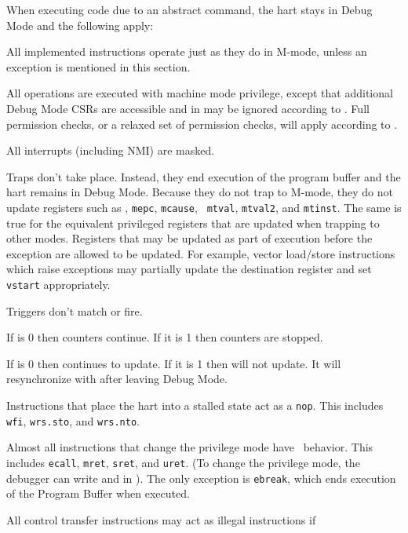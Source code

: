 \begin{steps}{When executing code due to an abstract command, the hart stays in
    Debug Mode and the following apply:}
\item All implemented instructions operate just as they do in M-mode, unless
    an exception is mentioned in this section.
\item All operations are executed with machine mode privilege, except that
    additional Debug Mode CSRs are accessible and
    \FcsrMstatusMprv in \Rmstatus may be ignored according to \FcsrDcsrMprven.
    Full permission checks, or a relaxed set of permission checks, will apply
    according to \FdmAbstractcsRelaxedpriv.
\item All interrupts (including NMI) are masked.
\item Traps don't take place. Instead, they end execution of the program buffer
    and the hart remains in Debug Mode. Because they do not trap to M-mode, they
    do not update registers such as \Rmstatus, {\tt mepc}, {\tt mcause}, {\tt
    mtval}, {\tt mtval2}, and {\tt mtinst}.  The same is true for the equivalent
    privileged registers that are updated when trapping to other modes.
    Registers that may be updated as part of execution before the exception are
    allowed to be updated.  For example, vector load/store instructions which
    raise exceptions may partially update the destination register and set
    {\tt vstart} appropriately.
\item Triggers don't match or fire.
\item If \FcsrDcsrStopcount is 0 then counters continue. If it is 1 then
    counters are stopped.
\item If \FcsrDcsrStoptime is 0 then \Rtime continues to update. If
    it is 1 then \Rtime will not update. It will resynchronize with
    \Rmtime after leaving Debug Mode.
\item Instructions that place the hart into a stalled state act as a {\tt nop}.
    This includes {\tt wfi}, {\tt wrs.sto}, and {\tt wrs.nto}.
\item Almost all instructions that change the privilege mode have \unspecified\
    behavior.  This includes {\tt ecall}, {\tt mret}, {\tt sret}, and {\tt uret}.
    (To change the privilege mode, the debugger can write
    \FcsrDcsrPrv and \FcsrDcsrV in \RcsrDcsr). The only exception is {\tt ebreak}, which ends
    execution of the Program Buffer when executed.
\item All control transfer instructions may act as illegal instructions if

\end{steps}

